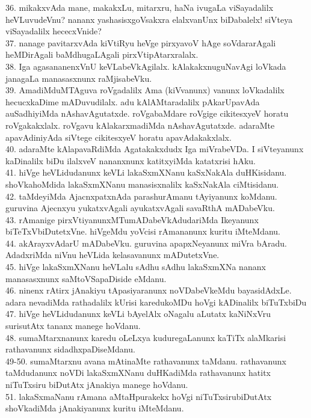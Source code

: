 \documentclass{article}
\begin{document}
36. mikakxvAda mane, makakxLu, mitarxru, haNa ivugaLa viSayadalilx heVLuvudeVnu? nananx yashasisxgoVsakxra elalxvanUnx biDabalelx! siVteya viSayadalilx hececxVnide?\\
37. nanage pavitarxvAda kiVtiRyu heVge pirxyavoV hAge soVdararAgali heMDirAgali baMdhugaLAgali pirxVtipAtarxralalx.\\
38. Iga agasananenxVnU keVLabeVkAgilalx. kAlakakxnuguNavAgi loVkada janagaLa manasasxnunx raMjisabeVku.\\
39. AmadiMduMTAguva roVgadalilx Ama (kiVvanunx) vanunx loVkadalilx hecucxkaDime mADuvudilalx. adu kAlAMtaradalilx pAkarUpavAda auSadhiyiMda nAshavAgutatxde. roVgabaMdare roVgige cikitesxyeV horatu roVgakakxlalx. roVgavu kAlakarxmadiMda nAshavAgutatxde. adaraMte apavAdiniyAda siVtege cikitesxyeV horatu apavAdakakxlalx.\\
40. adaraMte kAlapavaRdiMda Agatakakxdudx Iga miVrabeVDa. I siVteyanunx kaDinalilx biDu ilalxveV nananxnunx katitxyiMda katatxrisi hAku.\\
41. hiVge heVLidudanunx keVLi lakaSxmXNanu kaSxNakAla duHKisidanu. shoVkahoMdida lakaSxmXNanu manasisxnalilx kaSxNakAla ciMtisidanu.\\
42. taMdeyiMda AjacnxpatxnAda parashurAmanu tAyiyanunx koMdanu. guruvina Ajecnxyu yukatxvAgali ayukatxvAgali savaRthA mADabeVku.\\
43. rAmanige pirxVtiyanunxMTumADabeVkAdudariMda Ikeyanunx biTeTxVbiDutetxVne. hiVgeMdu yoVcisi rAmananunx kuritu iMteMdanu.\\
44. akArayxvAdarU mADabeVku. guruvina apapxNeyanunx miVra bAradu. AdadxriMda niVnu heVLida kelasavanunx mADutetxVne.\\
45. hiVge lakaSxmXNanu heVLalu sAdhu sAdhu lakaSxmXNa nananx manasasxnunx saMtoVSapaDiside eMdanu.\\
46. ninenx rAtirx jAnakiyu tApasiyaranunx noVDabeVkeMdu bayasidAdxLe. adara nevadiMda rathadalilx kUrisi karedukoMDu hoVgi kADinalilx biTuTxbiDu\\
47. hiVge heVLidudanunx keVLi bAyelAlx oNagalu aLutatx kaNiNxVru surisutAtx tananx manege hoVdanu.\\
48. sumaMtarxnanunx karedu oLeLxya kuduregaLanunx kaTiTx alaMkarisi rathavanunx sidadhxpaDiseMdanu.\\
49-50. sumaMtarxnu avana mAtinaMte rathavanunx taMdanu. rathavanunx taMdudanunx noVDi lakaSxmXNanu duHKadiMda rathavanunx hatitx niTuTxsiru biDutAtx jAnakiya manege hoVdanu.\\
51. lakaSxmaNanu rAmana aMtaHpurakekx hoVgi niTuTxsirubiDutAtx shoVkadiMda jAnakiyanunx kuritu iMteMdanu.\\
\end{document}
